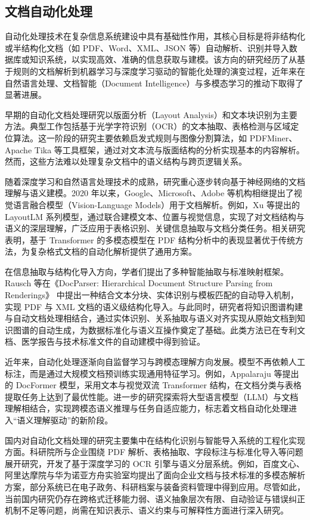 \subsection{文档自动化处理}

自动化处理技术在复杂信息系统建设中具有基础性作用，其核心目标是将非结构化或半结构化文档（如 PDF、Word、XML、JSON 等）自动解析、识别并导入数据库或知识系统，以实现高效、准确的信息获取与建模。该方向的研究经历了从基于规则的文档解析到机器学习与深度学习驱动的智能化处理的演变过程，近年来在自然语言处理、文档智能（Document Intelligence）与多模态学习的推动下取得了显著进展。

早期的自动化文档处理研究以版面分析（Layout Analysis）和文本块识别为主要方法。典型工作包括基于光学字符识别（OCR）的文本抽取、表格检测与区域定位算法。这一阶段的研究主要依赖启发式规则与图像分割算法，如 PDFMiner、Apache Tika 等工具框架，通过对文本流与版面结构的分析实现基本的内容解析。然而，这些方法难以处理复杂文档中的语义结构与跨页逻辑关系。

随着深度学习和自然语言处理技术的成熟，研究重心逐步转向基于神经网络的文档理解与语义建模。2020 年以来，Google、Microsoft、Adobe 等机构相继提出了视觉语言融合模型（Vision-Language Models）用于文档解析。例如，Xu 等提出的 LayoutLM 系列模型\cite{Xu2020LayoutLM,Huang2022LayoutLMv3}，通过联合建模文本、位置与视觉信息，实现了对文档结构与语义的深层理解，广泛应用于表格识别、关键信息抽取与文档分类任务。相关研究表明，基于 Transformer 的多模态模型在 PDF 结构分析中的表现显著优于传统方法，为复杂格式文档的自动化解析提供了通用方案。

在信息抽取与结构化导入方向，学者们提出了多种智能抽取与标准映射框架。Rausch 等在《DocParser: Hierarchical Document Structure Parsing from Renderings》\cite{Rausch2021DocParser} 中提出一种结合文本分块、实体识别与模板匹配的自动导入机制，实现 PDF 与 XML 文档的语义级结构化导入。与此同时，研究者将知识图谱构建与自动文档处理相结合，通过实体识别、关系抽取与语义对齐实现从原始文档到知识图谱的自动生成，为数据标准化与语义互操作奠定了基础。此类方法已在专利文档、医学报告与技术标准文件的自动建模中得到验证。

近年来，自动化处理逐渐向自监督学习与跨模态理解方向发展。模型不再依赖人工标注，而是通过大规模文档预训练实现通用特征学习。例如，Appalaraju 等提出的 DocFormer 模型\cite{Appalaraju2021DocFormer}，采用文本与视觉双流 Transformer 结构，在文档分类与表格提取任务上达到了最优性能。进一步的研究探索将大型语言模型（LLM）与文档理解相结合，实现跨模态语义推理与任务自适应能力\cite{Wang2023DocumentLLM}，标志着文档自动化处理进入“语义理解驱动”的新阶段。

国内对自动化文档处理的研究主要集中在结构化识别与智能导入系统的工程化实现方面。科研院所与企业围绕 PDF 解析、表格抽取、字段标注与标准化导入等问题展开研究，开发了基于深度学习的 OCR 引擎与语义分层系统。例如，百度文心、阿里达摩院与华为诺亚方舟实验室均提出了面向企业文档与技术标准的多模态解析方案，部分系统已在电子政务、科研档案与装备资料管理中得到应用。尽管如此，当前国内研究仍存在跨格式迁移能力弱、语义抽象层次有限、自动验证与错误纠正机制不足等问题，尚需在知识表示、语义约束与可解释性方面进行深入研究。

